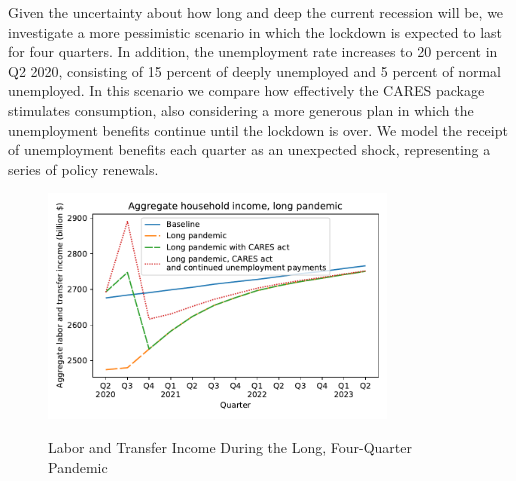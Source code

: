 \documentclass[titlepage,a4paper]{\econtex}
\begin{document}
Given the uncertainty about how long and deep the current recession will be, we investigate a more pessimistic scenario in which the lockdown is expected to last for four quarters.
In addition, the unemployment rate increases to 20 percent in Q2 2020, consisting of 15 percent of deeply unemployed and 5 percent of normal unemployed.
In this scenario we compare how effectively the CARES package stimulates consumption, also considering a more generous plan in which the unemployment benefits continue until the lockdown is over.
We model the receipt of unemployment benefits each quarter as an unexpected shock, representing a series of policy renewals.

\begin{figure}
  \centering
  \caption{Labor and Transfer Income During the Long, Four-Quarter Pandemic}
  \label{inc_response_pandemic}
  { \includegraphics[width=0.8\textwidth]{./Figures/AggLT_long_pandemic}}
\end{figure}
\end{document}
